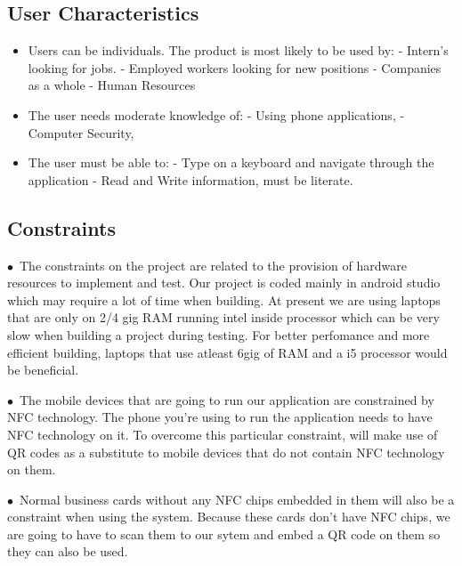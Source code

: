 \documentclass[english]{article}
\begin{document}
				\subsection{User Characteristics}
				\begin{itemize}
					\item
					Users can be individuals. The product is most likely to be used by:
					\subitem
					- Intern's looking for jobs.
					\subitem
					- Employed workers looking for new positions
					\subitem
					- Companies as a whole
					\subitem
					- Human Resources
					\item 
					The user needs moderate knowledge of:
					\subitem 
					- Using phone applications, 
					\subitem 
					- Computer Security,  
					\item 
					The user must be able to: 
					\subitem
					- Type on a keyboard and navigate through the application
					\subitem
					- Read and Write information, must be literate.
				\end{itemize}
				
			
				\subsection{Constraints}
            
				
				$\bullet$\  The constraints on the project are related to the provision of hardware resources to implement and test. Our project is coded mainly in android studio which may require a lot of time when building. At present we are using laptops                                 				that are only on 2/4 gig RAM running intel inside processor which can be very slow when building a project during testing. For better perfomance and more efficient building, laptops that use atleast 6gig of RAM and a i5 processor would be 							beneficial.\par

                                	$\bullet$\ The mobile devices that are going to run our application are constrained by NFC technology. The phone you're using to run the application needs to have NFC technology on it. To overcome this particular constraint, will make use of QR codes 					as a substitute to mobile devices that do not contain NFC technology on them. 

                                	$\bullet$\ Normal business cards without any NFC chips embedded in them will also be a constraint when using the system. Because these cards don't have NFC chips, we are going to have  to scan them to our sytem and embed a QR code on them so 					they can also be used.
\end{document}
